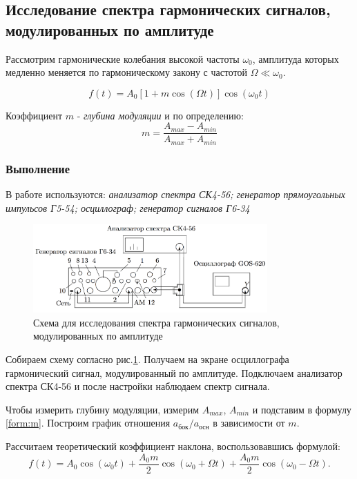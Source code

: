 \documentclass[a4paper, 12pt,twoside]{article}
\begin{document}
\subsection*{Исследование спектра гармонических сигналов, модулированных по амплитуде}

Рассмотрим гармонические колебания высокой частоты $\omega_0$, амплитуда которых медленно меняется по гармоническому закону с частотой $\Omega \ll \omega_0$.

\begin{equation}
\label{form:amf(t)_a_n}
	f(t) = A_0[1+m\cos(\Omega t)]\cos(\omega_0t)
\end{equation}

Коэффициент $m$ - {\it{глубина модуляции}} и по определению:
\begin{equation}
\label{form:m}
	m = \frac{A_{max}-A_{min}}{A_{max}+A_{min}}
\end{equation}

\subsubsection*{Выполнение}
В работе используются: \textit{анализатор спектра СК4-56; генератор прямоугольных импульсов Г5-54; осциллограф; генератор сигналов Г6-34}

\begin{figure}[H]
\centering
\includegraphics[width = 0.8\textwidth]{schemeC}
\caption{Схема для исследования спектра гармонических сигналов, модулированных по амплитуде}
\label{img:scheme C}
\end{figure}

Собираем схему согласно рис.\ref{img:scheme C}. Получаем на экране осциллографа гармонический сигнал, модулированный по амплитуде. Подключаем анализатор спектра СК4-56 и после настройки наблюдаем спектр сигнала.

Чтобы измерить глубину модуляции, измерим $A_{max}$, $A_{min}$ и подставим в формулу \ref{form:m}. Построим график отношения $a_\text{бок}/a_\text{осн}$ в зависимости от $m$.

Рассчитаем теоретический коэффициент наклона, воспользовавшись формулой:
\begin{equation}
\label{form:a/a(m)}
	f(t)=A_0\cos(\omega_0t)+	\frac{A_0m}{2}\cos(\omega_0+\Omega t)+\frac{A_0m}{2}\cos(\omega_0-\Omega t). 
\end{equation}
\end{document}
